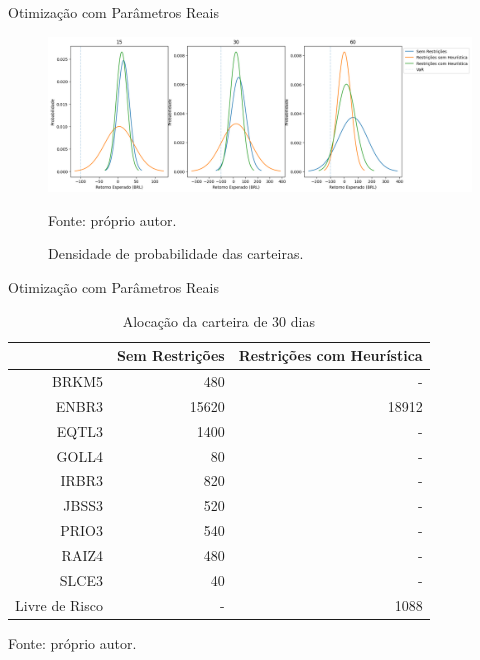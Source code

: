     \begin{frame}{Otimização com Parâmetros Reais}
        
        \begin{figure}[H]
            \centering
            \caption{Densidade de probabilidade das carteiras.}
            \label{fig:densidade_carteiras}
            \includegraphics[width=\textwidth]{./images/distribuicao_carteiras.png}
            \par \footnotesize Fonte: próprio autor.
        \end{figure}

    \end{frame}





    \begin{frame}{Otimização com Parâmetros Reais}
        
        \begin{table}[htbp]
            \centering
            \caption{Alocação da carteira de 30 dias}
            \label{tab:distribuicao_carteira_30}
            \begin{tabular}{rrr}
                \hline
                & Sem Restrições & Restrições com Heurística \\
                \hline\hline
               BRKM5 & 480 & - \\
               ENBR3 & 15620 & 18912 \\
               EQTL3 & 1400 & - \\
               GOLL4 & 80 & - \\
               IRBR3 & 820 & - \\
               JBSS3 & 520 & - \\
               PRIO3 & 540 & - \\
               RAIZ4 & 480 & - \\
               SLCE3 & 40 & - \\
               Livre de Risco & - & 1088 \\
               \hline
            \end{tabular}
            \par \footnotesize Fonte: próprio autor. 
        \end{table}

    \end{frame}





